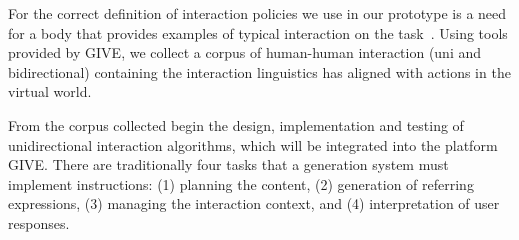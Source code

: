 For the correct definition of interaction policies we use in our prototype is a
need for a body that provides examples of typical interaction on the
task~\cite{HCRC-93,byron-06}. Using tools provided by GIVE, we collect a corpus
of human-human interaction (uni and bidirectional) containing the interaction
linguistics has aligned with actions in the virtual world.


From the corpus collected begin the design, implementation and testing of
unidirectional interaction algorithms, which will be integrated into the
platform GIVE. There are traditionally four tasks that a generation system must
implement instructions: (1) planning the content, (2) generation of referring
expressions, (3) managing the interaction context, and (4) interpretation of
user responses. 
% 

